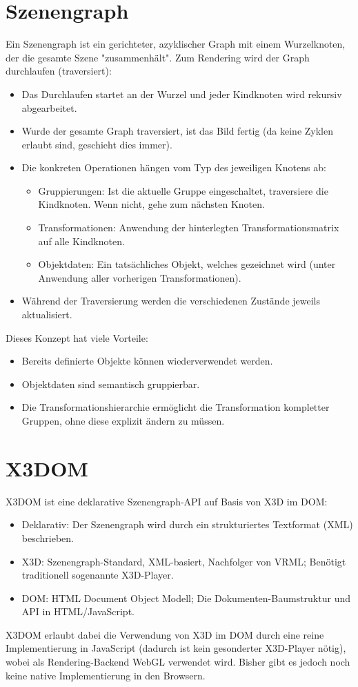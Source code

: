 		\section{Szenengraph}
			Ein Szenengraph ist ein gerichteter, azyklischer Graph mit einem Wurzelknoten, der die gesamte Szene "zusammenhält". Zum Rendering wird der Graph durchlaufen (traversiert):
			\begin{itemize}
				\item Das Durchlaufen startet an der Wurzel und jeder Kindknoten wird rekursiv abgearbeitet.
				\item Wurde der gesamte Graph traversiert, ist das Bild fertig (da keine Zyklen erlaubt sind, geschieht dies immer).
				\item Die konkreten Operationen hängen vom Typ des jeweiligen Knotens ab:
					\begin{itemize}
						\item Gruppierungen: Ist die aktuelle Gruppe eingeschaltet, traversiere die Kindknoten. Wenn nicht, gehe zum nächsten Knoten.
						\item Transformationen: Anwendung der hinterlegten Transformationsmatrix auf alle Kindknoten.
						\item Objektdaten: Ein tatsächliches Objekt, welches gezeichnet wird (unter Anwendung aller vorherigen Transformationen).
					\end{itemize}
				\item Während der Traversierung werden die verschiedenen Zustände jeweils aktualisiert.
			\end{itemize}
			Dieses Konzept hat viele Vorteile:
			\begin{itemize}
				\item Bereits definierte Objekte können wiederverwendet werden.
				\item Objektdaten sind semantisch gruppierbar.
				\item Die Transformationshierarchie ermöglicht die Transformation kompletter Gruppen, ohne diese explizit ändern zu müssen.
			\end{itemize}

		\section{X3DOM}
			X3DOM ist eine deklarative Szenengraph-API auf Basis von X3D im DOM:
			\begin{itemize}
				\item Deklarativ: Der Szenengraph wird durch ein strukturiertes Textformat (\zB XML) beschrieben.
				\item X3D: Szenengraph-Standard, XML-basiert, Nachfolger von VRML; Benötigt traditionell sogenannte X3D-Player.
				\item DOM: HTML Document Object Modell; Die Dokumenten-Baumstruktur und API in HTML/JavaScript.
			\end{itemize}
			X3DOM erlaubt dabei die Verwendung von X3D im DOM durch eine reine Implementierung in JavaScript (dadurch ist kein gesonderter X3D-Player nötig), wobei als Rendering-Backend \zB WebGL verwendet wird. Bisher gibt es jedoch noch keine native Implementierung in den Browsern.

